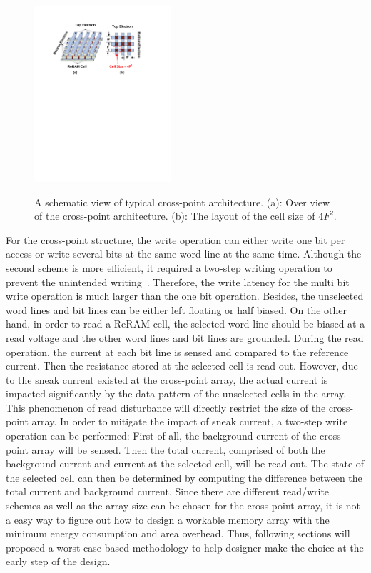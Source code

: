 \begin{figure}
\centering
  \includegraphics[width=0.45\textwidth]{./figures/crossbar_array2.pdf}\\\vspace{-10pt}
  \caption{A schematic view of typical cross-point architecture. (a): Over view of the cross-point architecture. (b): The layout of the cell size of $4F^2$. }\label{fig:array}
\vspace{-12pt}
\end{figure}

For the cross-point structure, the write operation can either write one bit per access or write several bits at the same word line at the same time. Although the second scheme is more efficient, it required a two-step writing operation to prevent the unintended writing~\cite{memristor:Cong}. Therefore, the write latency for the multi bit write operation is much larger than the one bit operation. Besides, the unselected word lines and bit lines can be either left floating or half biased. On the other hand, in order to read a ReRAM cell, the selected word line should be biased at a read voltage and the other word lines and bit lines are grounded. During the read operation, the current at each bit line is sensed and compared to the reference current. Then the resistance stored at the selected cell is read out. However, due to the sneak current existed at the cross-point array, the actual current is impacted significantly by the data pattern of the unselected cells in the array. This phenomenon of read disturbance will directly restrict the size of the cross-point array. In order to mitigate the impact of sneak current, a two-step write operation can be performed: First of all, the background current of the cross-point array  will be sensed. Then the total current, comprised of both the background current and current at the selected cell, will be read out. The state of the selected cell can then be determined by computing the difference between the total current and background current. Since there are different read/write schemes as well as the array size can be chosen for the cross-point array, it is not a easy way to figure out how to design a workable memory array with the minimum energy consumption and area overhead. Thus, following sections will proposed a worst case based methodology to help designer make the choice at the early step of the design.


